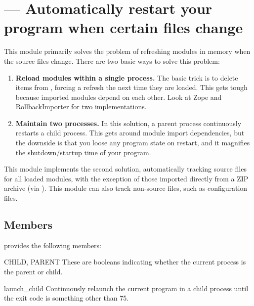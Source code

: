 \section{ ---
         Automatically restart your program when certain files change}



This module primarily solves the problem of refreshing modules in memory when
the source files change. There are two basic ways to solve this problem:

\begin{enumerate}

\item{\textbf{Reload modules within a single process.} The basic trick is to
delete items from , forcing a refresh the next time they are
loaded. This gets tough because imported modules depend on each other. Look at
Zope and RollbackImporter for two implementations.}

\item{\textbf{Maintain two processes.} In this solution, a parent process
continuously restarts a child process. This gets around module import
dependencies, but the downside is that you loose any program state on restart,
and it magnifies the shutdown/startup time of your program.}

\end{enumerate}

This module implements the second solution, automatically tracking source files
for all loaded modules, with the exception of those imported directly from a ZIP
archive (via
).
This module can also track non-source files, such as configuration files.


\subsection{Members}

 provides the following members:

\begin{datadesc}{CHILD, PARENT} These are booleans indicating whether the
current process is the parent or child. \end{datadesc}

\begin{funcdesc}{launch_child}{} Continuously relaunch the current program in a
child process until the exit code is something other than 75. \end{funcdesc}

